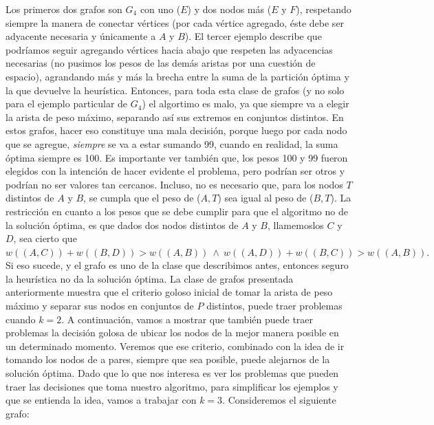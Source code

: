 \documentclass[a4paper]{article}
\begin{document}
Los primeros dos grafos son $G_4$ con uno ($E$) y dos nodos más ($E$ y $F$), respetando siempre la manera de conectar vértices (por cada vértice agregado, éste debe ser adyacente necesaria y únicamente a $A$ y $B$). El tercer ejemplo describe que podríamos seguir agregando vértices hacia abajo que respeten las adyacencias necesarias (no pusimos los pesos de las demás aristas por una cuestión de espacio), agrandando más y más la brecha entre la suma de la partición óptima y la que devuelve la heurística. Entonces, para toda esta clase de grafos (y no solo para el ejemplo particular de $G_4$) el algortimo es malo, ya que siempre va a elegir la arista de peso máximo, separando así sus extremos en conjuntos distintos. En estos grafos, hacer eso constituye una mala decisión, porque luego por cada nodo que se agregue, \textit{siempre} se va a estar sumando 99, cuando en realidad, la suma óptima siempre es 100.
\newline Es importante ver también que, los pesos 100 y 99 fueron elegidos con la intención de hacer evidente el problema, pero podrían ser otros y podrían no ser valores tan cercanos. Incluso, no es necesario que, para los nodos $T$ distintos de $A$ y $B$, se cumpla que el peso de ($A, T$) sea igual al peso de ($B, T$). La restricción en cuanto a los pesos que se debe cumplir para que el algoritmo no de la solución óptima, es que dados dos nodos distintos de $A$ y $B$, llamemoslos $C$ y $D$, sea cierto que $w((A, C)) + w((B, D)) > w((A, B)) \ \wedge \ w((A, D)) + w((B, C)) > w((A, B)).$ Si eso sucede, y el grafo es uno de la clase que describimos antes, entonces seguro la heurística no da la solución óptima.
\newline
\newline La clase de grafos presentada anteriormente muestra que el criterio goloso inicial de tomar la arista de peso máximo y separar sus nodos en conjuntos de $P$ distintos, puede traer problemas cuando $k = 2$. A continuación, vamos a mostrar que también puede traer problemas la decisión golosa de ubicar los nodos de la mejor manera posible en un determinado momento. Veremos que ese criterio, combinado con la idea de ir tomando los nodos de a pares, siempre que sea posible, puede alejarnos de la solución óptima. 
\newline Dado que lo que nos interesa es ver los problemas que pueden traer las decisiones que toma nuestro algoritmo, para simplificar los ejemplos y que se entienda la idea, vamos a trabajar con $k = 3$.
\newline
\newline Consideremos el siguiente grafo:
\end{document}
